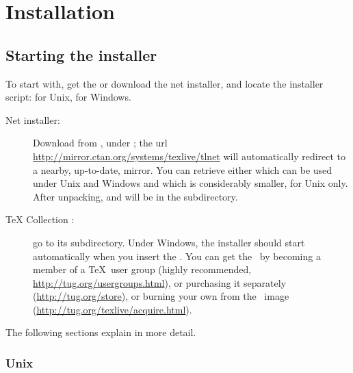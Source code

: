 \documentclass{article}
\begin{document}
\section{Installation}
\label{sec:install}

\subsection{Starting the installer}
\label{sec:inst-start}

To start with, get the \TK{} \DVD{} or download the \TL{} net installer,
and locate the installer script:  for Unix,
 for Windows.

\begin{description}
\item [Net installer:] Download from \CTAN, under
; the url
\url{http://mirror.ctan.org/systems/texlive/tlnet} will automatically
redirect to a nearby, up-to-date, mirror.  You can retrieve either
 which can be used under Unix and Windows and
 which is considerably smaller, for Unix
only. After unpacking,  and
 will be in the 
subdirectory.

\item [\TeX{} Collection \DVD:] go to its 
subdirectory. Under Windows, the installer should start automatically
when you insert the \DVD.  You can get the \DVD\ by becoming a member of
a \TeX\ user group (highly recommended,
\url{http://tug.org/usergroups.html}), or purchasing it separately
(\url{http://tug.org/store}), or burning your own from the \ISO\
image (\url{http://tug.org/texlive/acquire.html}).

\end{description}
The following sections explain in more detail.

\subsubsection{Unix}
\end{document}
